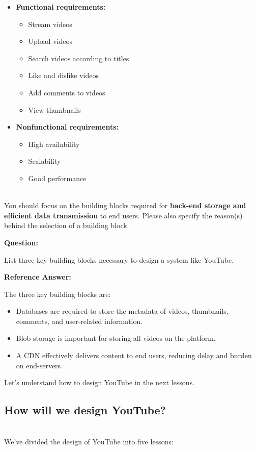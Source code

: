 \begin{itemize}
\item
\textbf{Functional requirements:}

\begin{itemize}
\item
Stream videos
\item
Upload videos
\item
Search videos according to titles
\item
Like and dislike videos
\item
Add comments to videos
\item
View thumbnails
\end{itemize}
\item
\textbf{Nonfunctional requirements:}

\begin{itemize}
\item
High availability
\item
Scalability
\item
Good performance
\end{itemize}
\end{itemize}
\\
You should focus on the building blocks required for \textbf{back-end storage and efficient data transmission} to end users. Please also specify the reason(s) behind the selection of a building block.

\textbf{Question:}

List three key building blocks necessary to design a system like YouTube.

\textbf{Reference Answer:}

The three key building blocks are:

\begin{itemize}
\tightlist
\item
Databases are required to store the metadata of videos, thumbnails, comments, and user-related information.
\item
Blob storage is important for storing all videos on the platform.
\item
A CDN effectively delivers content to end users, reducing delay and burden on end-servers.
\end{itemize}

Let's understand how to design YouTube in the next lessons.

\subsection{How will we design YouTube?}\label{mt8IyDQRiQlNRwxW7F9WM}
\\
We've divided the design of YouTube into five lessons:

